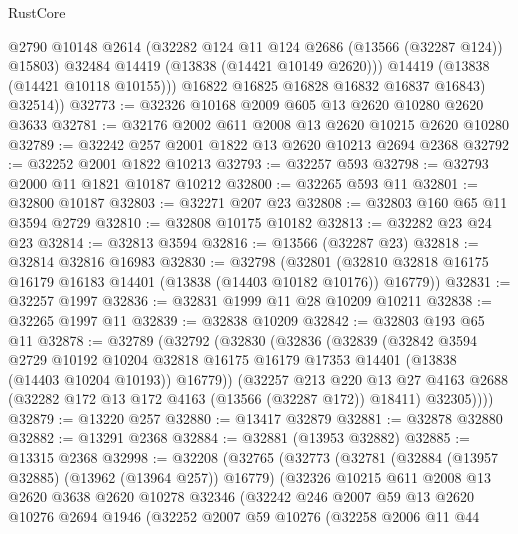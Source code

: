 \begin{lexlean}{RustCore}
\begin{coremodule}
              @2790
              @10148
              @2614
              (@32282 @124 @11 @124 @2686 (@13566 (@32287 @124)) @15803)
              @32484
              @14419
              (@13838 (@14421 @10149 @2620)))
            @14419
            (@13838 (@14421 @10118 @10155)))
          @16822
          @16825
          @16828
          @16832
          @16837
          @16843)
        @32514))
@32773 := @32326 @10168 @2009 @605 @13 @2620 @10280 @2620 @3633
@32781 := @32176 @2002 @611 @2008 @13 @2620 @10215 @2620 @10280
@32789 := @32242 @257 @2001 @1822 @13 @2620 @10213 @2694 @2368
@32792 := @32252 @2001 @1822 @10213
@32793 := @32257 @593
@32798 := @32793 @2000 @11 @1821 @10187 @10212
@32800 := @32265 @593 @11
@32801 := @32800 @10187
@32803 := @32271 @207 @23
@32808 := @32803 @160 @65 @11 @3594 @2729
@32810 := @32808 @10175 @10182
@32813 := @32282 @23 @24 @23
@32814 := @32813 @3594
@32816 := @13566 (@32287 @23)
@32818 := @32814 @32816 @16983
@32830 := @32798
    (@32801 (@32810 @32818 @16175 @16179 @16183 @14401 (@13838 (@14403 @10182 @10176)) @16779))
@32831 := @32257 @1997
@32836 := @32831 @1999 @11 @28 @10209 @10211
@32838 := @32265 @1997 @11
@32839 := @32838 @10209
@32842 := @32803 @193 @65 @11
@32878 := @32789
    (@32792
      (@32830
        (@32836
          (@32839
            (@32842
              @3594
              @2729
              @10192
              @10204
              @32818
              @16175
              @16179
              @17353
              @14401
              (@13838 (@14403 @10204 @10193))
              @16779))
          (@32257
            @213
            @220
            @13
            @27
            @4163
            @2688
            (@32282 @172 @13 @172 @4163 (@13566 (@32287 @172)) @18411)
            @32305))))
@32879 := @13220 @257
@32880 := @13417 @32879
@32881 := @32878 @32880
@32882 := @13291 @2368
@32884 := @32881 (@13953 @32882)
@32885 := @13315 @2368
@32998 := @32208
    (@32765
      (@32773
        (@32781
          (@32884 (@13957 @32885) (@13962 (@13964 @257)) @16779)
          (@32326
            @10215
            @611
            @2008
            @13
            @2620
            @3638
            @2620
            @10278
            @32346
            (@32242
              @246
              @2007
              @59
              @13
              @2620
              @10276
              @2694
              @1946
              (@32252
                @2007
                @59
                @10276
                (@32258
                  @2006
                  @11
                  @44

\end{coremodule}
\end{lexlean}
